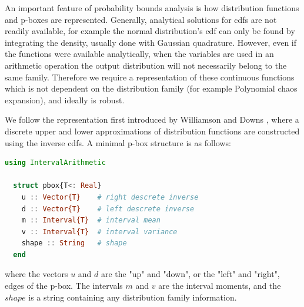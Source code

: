\documentclass{juliacon}
\begin{document}
An important feature of probability bounds analysis is how distribution functions and p-boxes are represented. Generally, analytical solutions for cdfs are not readily available, for example the normal distribution's cdf can only be found by integrating the density, usually done with Gaussian quadrature. However, even if the functions were available analytically, when the variables are used in an arithmetic operation the output distribution will not necessarily belong to the same family. Therefore we require a representation of these continuous functions which is not dependent on the distribution family (for example Polynomial chaos expansion), and ideally is robust.

We follow the representation first introduced by Williamson and Downs \cite{williamson1990probabilistic}, where a discrete upper and lower approximations of distribution functions are constructed using the inverse cdfs. A minimal p-box structure is as follows:

\begin{lstlisting}[language = Julia]
  using IntervalArithmetic

  struct pbox{T<: Real}
    u :: Vector{T}    # right descrete inverse
    d :: Vector{T}    # left descrete inverse
    m :: Interval{T}  # interval mean
    v :: Interval{T}  # interval variance
    shape :: String   # shape
  end
\end{lstlisting}

\noindent where the vectors $u$ and $d$ are the "up" and "down", or the "left" and "right", edges of the p-box. The intervals $m$ and $v$ are the interval moments, and the $shape$ is a string containing any distribution family information.
\end{document}
